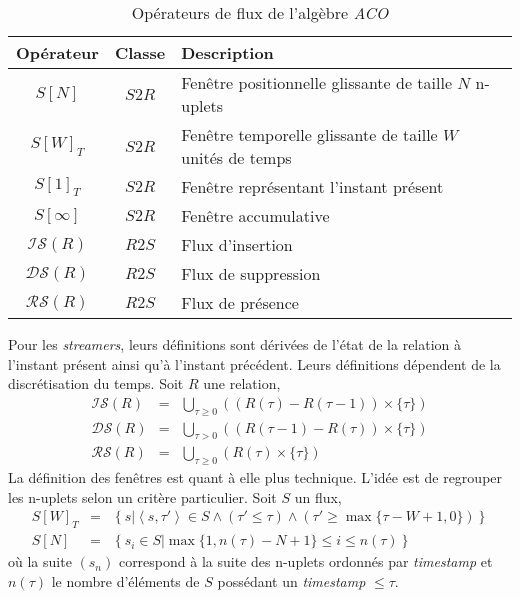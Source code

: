 \begin{table}[ht]
 \centering
\begin{tabular}{|c|c|l|}\bottomrule
Opérateur & Classe & Description \\\toprule \bottomrule
$S[N]$ & $S2R$ & Fenêtre positionnelle glissante de taille $N$ n-uplets \\ \hline
$S[W]_T$ & $S2R$ & Fenêtre temporelle glissante de taille $W$ unités de temps \\\hline
$S[1]_T$ & $S2R$ & Fenêtre représentant l'instant présent\\\hline
$S[\infty]$ & $S2R$ & Fenêtre accumulative\\ \toprule \bottomrule
$\mathcal{IS}(R)$ & $R2S$ & Flux d'insertion \\ \hline
$\mathcal{DS}(R)$ & $R2S$ & Flux de suppression \\ \hline
$\mathcal{RS}(R)$ & $R2S$ & Flux de présence \\ \toprule
\end{tabular}
\caption{Opérateurs de flux de l'algèbre \textit{ACO}}\label{tab:rw:sgfd:acostream}
\end{table}

Pour les \textit{streamers}, leurs définitions sont dérivées de l'état de la relation à l'instant présent ainsi qu'à l'instant précédent. Leurs définitions dépendent de la discrétisation du temps. Soit $R$ une relation,
\begin{eqnarray*}
    \mathcal{IS}(R) & = & \bigcup_{\tau\geq 0} ((R(\tau) - R(\tau-1))\times \{\tau\})\\
    \mathcal{DS}(R) & = & \bigcup_{\tau>0} ((R(\tau-1) - R(\tau))\times \{\tau\})\\
    \mathcal{RS}(R) & = & \bigcup_{\tau\geq 0} (R(\tau)\times \{\tau\})
\end{eqnarray*}
La définition des fenêtres est quant à elle plus technique. L'idée est de regrouper les n-uplets selon un critère particulier. Soit $S$ un flux,
\begin{eqnarray*}
    S[W]_T & = & \left\{s | \left<s,\tau'\right>\in S \wedge (\tau' \leq \tau) \wedge (\tau' \geq \max\{\tau - W +1,0\})   \right\}\\
    S[N] & = & \left\{s_i \in S | \max\{1,n(\tau)-N+1\} \leq i \leq n(\tau)\right\}
\end{eqnarray*}
où la suite $(s_n)$ correspond à la suite des n-uplets ordonnés par \textit{timestamp} et $n(\tau)$ le nombre d'éléments de $S$ possédant un \textit{timestamp} $\leq \tau$.

